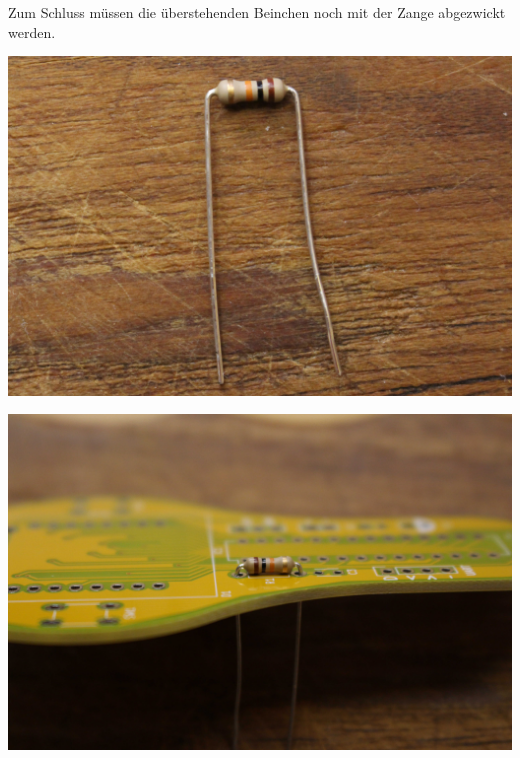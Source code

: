 \documentclass{article}
\begin{document}
Zum Schluss müssen die überstehenden Beinchen noch mit der Zange abgezwickt werden.

\vspace{1cm}

\begin{minipage}[b]{0.5\textwidth}
	\includegraphics[width=\textwidth]{Bilder/IMG_5538.JPG}
\end{minipage}
\begin{minipage}[b]{0.5\textwidth}
	\includegraphics[width=\textwidth]{Bilder/IMG_5539.JPG}
\end{minipage}

\vspace{0.5cm}
\end{document}
